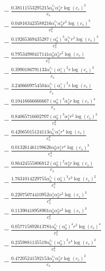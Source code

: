 \documentclass[10pt]{article}
\begin{document}
\begin{align*}
&{}  - \frac{0.38111553295215 \alpha_{0}^{c_s} \alpha_{4}^s r \log{\left(c_{s} \right)}^{2}}{c_{s}} \\
&{}  - \frac{0.048163423588216 \alpha_{1}^{c_s} \alpha_{2}^s r^{2} \log{\left(c_{s} \right)}^{3}}{c_{s}^{2}} \\
&{}  - \frac{0.19265369435287 \left(\alpha_{0}^s\right)^{3} \alpha_{1}^{c_s} r^{2} \log{\left(c_{s} \right)}^{3}}{c_{s}^{2}} \\
&{}  - \frac{0.79534980417141 \alpha_{0}^s \alpha_{3}^s r^{2} \log{\left(c_{s} \right)}}{c_{s}^{2}} \\
&{}  - \frac{0.3990186791133 \alpha_{1}^{c_s} \left(\alpha_{1}^s\right)^{2} r \log{\left(c_{s} \right)}^{3}}{c_{s}} \\
&{}  - \frac{3.2406609754504 \alpha_{1}^{c_s} \left(\alpha_{1}^s\right)^{2} r \log{\left(c_{s} \right)}}{c_{s}} \\
&{}  - \frac{0.10416666666667 \left(\alpha_{0}^s\right)^{3} \alpha_{2}^s r \log{\left(c_{s} \right)}^{4}}{c_{s}} \\
&{}  - \frac{0.84065716602707 \left(\alpha_{0}^s\right)^{3} \alpha_{1}^s r^{2} \log{\left(c_{s} \right)}^{3}}{c_{s}^{2}} \\
&{}  - \frac{0.42065015124113 \alpha_{0}^{c_s} \alpha_{1}^s r^{4} \log{\left(c_{s} \right)}}{c_{s}^{4}} \\
&{}  - \frac{0.013261461198626 \alpha_{0}^s \alpha_{1}^s r^{4} \log{\left(c_{s} \right)}^{3}}{c_{s}^{4}} \\
&{}  - \frac{0.86424555806812 \left(\alpha_{0}^s\right)^{2} \alpha_{3}^s r \log{\left(c_{s} \right)}}{c_{s}} \\
&{}  - \frac{1.7631014229755 \alpha_{0}^{c_s} \left(\alpha_{0}^s\right)^{3} r^{3} \log{\left(c_{s} \right)}^{2}}{c_{s}^{3}} \\
&{}  - \frac{0.22075074410952 \alpha_{1}^s \alpha_{2}^s r^{2} \log{\left(c_{s} \right)}^{3}}{c_{s}^{2}} \\
&{}  - \frac{0.11390418958901 \alpha_{0}^s \alpha_{3}^s r^{2} \log{\left(c_{s} \right)}^{3}}{c_{s}^{2}} \\
&{}  - \frac{0.057715892613781 \alpha_{0}^{c_s} \left(\alpha_{0}^s\right)^{4} r^{2} \log{\left(c_{s} \right)}^{4}}{c_{s}^{2}} \\
&{}  - \frac{0.2359881135519 \alpha_{0}^{c_s} \left(\alpha_{0}^s\right)^{2} r^{4} \log{\left(c_{s} \right)}^{2}}{c_{s}^{4}} \\
&{}  - \frac{0.47205241592153 \alpha_{2}^{c_s} \alpha_{2}^s r \log{\left(c_{s} \right)}^{2}}{c_{s}} \\

\end{align*}
\end{document}
